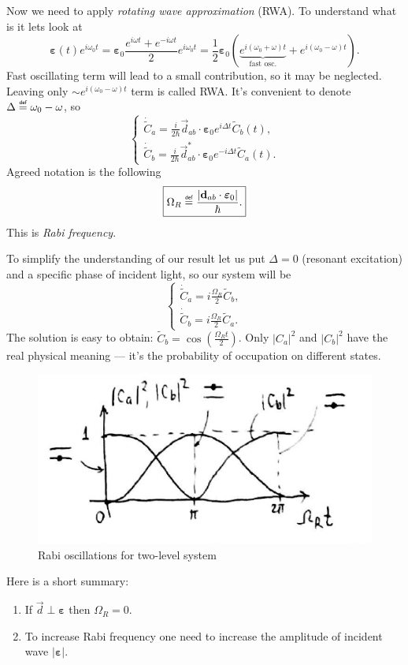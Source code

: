 Now we need to apply \textit{rotating wave approximation} (RWA). To understand what is it lets look at 
\begin{equation}
	\bm{\varepsilon}(t) e^{i \omega_0 t} = \bm{\varepsilon}_0 \frac{e^{i \omega t} + e^{- i \omega t}}{2} e^{i \omega_0 t}= \frac{1}{2} \bm{\varepsilon}_0 \left( \underbrace{e^{i(\omega_0 + \omega) t}}_{\text{fast osc.}} + e^{i(\omega_0 - \omega) t} \right).
\end{equation}
Fast oscillating term will lead to a small contribution, so it may be neglected. Leaving only $\sim e^{i (\omega_0 - \omega)t}$ term is called RWA. It's convenient to denote $\Delta \myeq \omega_0 - \omega$, so
\begin{equation}
	\begin{cases}
		\dot{\widetilde{C}}_a = \frac{i}{2\hbar}\vec{d}_{ab} \cdot \bm{\varepsilon}_0 e^{i \Delta t} \widetilde{C}_b(t), \\
		\dot{\widetilde{C}}_b = \frac{i}{2\hbar}\vec{d}^*_{ab} \cdot \bm{\varepsilon}_0 e^{-i \Delta t} \widetilde{C}_a(t).
	\end{cases} 
\end{equation}
Agreed notation is the following
\begin{equation}
	\boxed{\Omega_R \myeq \frac{\left|\vec{d}_{ab} \cdot \bm{\varepsilon}_0\right|}{\hbar}.}
\end{equation}
This is \textit{Rabi frequency}.

To simplify the understanding of our result let us put $\Delta =0$ (resonant excitation) and a specific phase of incident light, so our system will be
\begin{equation}
	\begin{cases}
		\dot{\widetilde{C}}_a = i \frac{\Omega_R}{2} \widetilde{C}_b, \\
		\dot{\widetilde{C}}_b = i \frac{\Omega_R}{2} \widetilde{C}_a.
	\end{cases}
	\label{eq:rabi_system}
\end{equation}
The solution is easy to obtain: $\widetilde{C}_b = \cos \left( \frac{\Omega_R t}{2} \right)$. Only $\left| C_a\right|^2$ and $\left| C_b \right|^2$ have the real physical meaning --- it's the probability of occupation on different states.
\begin{figure}[h!]
	\centering
	\includegraphics[width=0.65\linewidth]{fig/L4/rabi_osc}
	\caption{Rabi oscillations for two-level system}
	\label{fig:rabiosc}
\end{figure}

Here is a short summary:
\begin{enumerate}
	\item If $\vec{d} \perp \bm{\varepsilon}$ then $\Omega_R = 0$.
	\item To increase Rabi frequency one need to increase the amplitude of incident wave $\left| \bm{\varepsilon} \right|$. 
\end{enumerate}
